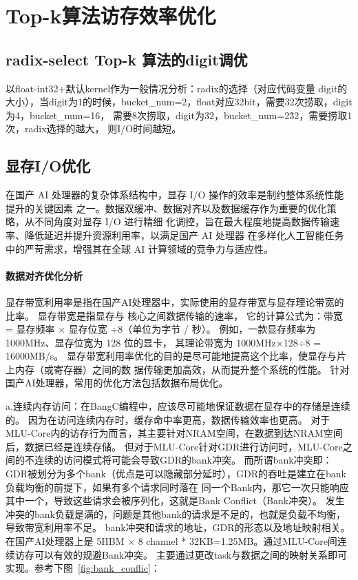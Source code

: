 \section{Top-k算法访存效率优化}
\subsection{radix-select Top-k 算法的digit调优}

以float-int32+默认kernel作为一般情况分析：radix的选择（对应代码变量
digit的大小），当digit为1的时候，bucket\_num=2，float对应32bit，需要32次捞取，digit为4，bucket\_num=16，
需要8次捞取，digit为32，bucket\_num=2\^32，需要捞取1次，radix选择的越大，
则I/O时间越短。


\subsection{显存I/O优化}
在国产 AI 处理器的复杂体系结构中，显存 I/O 操作的效率是制约整体系统性能提升的关键因素
之一。数据双缓冲、数据对齐以及数据缓存作为重要的优化策略，从不同角度对显存 I/O 进行精细
化调控，旨在最大程度地提高数据传输速率、降低延迟并提升资源利用率，以满足国产 AI 处理器
在多样化人工智能任务中的严苛需求，增强其在全球 AI 计算领域的竞争力与适应性。


\paragraph{数据对齐优化分析}

显存带宽利用率是指在国产AI处理器中，实际使用的显存带宽与显存理论带宽的比率。
显存带宽是指显存与 核心之间数据传输的速率，
它的计算公式为：带宽 = 显存频率 × 显存位宽 ÷8（单位为字节 / 秒）。
例如，一款显存频率为 1000MHz、显存位宽为 128 位的显卡，
其理论带宽为 1000MHz×128÷8 = 16000MB/s。
显存带宽利用率优化的目的是尽可能地提高这个比率，使显存与片上内存（或寄存器）之间的数
据传输更加高效，从而提升整个系统的性能。
针对国产AI处理器，常用的优化方法包括数据布局优化。

a.连续内存访问：在BangC编程中，应该尽可能地保证数据在显存中的存储是连续的。
因为在访问连续内存时，缓存命中率更高，数据传输效率也更高。
对于MLU-Core内的访存行为而言，其主要针对NRAM空间，在数据到达NRAM空间后，数据已经是连续存储。
但对于MLU-Core针对GDR进行访问时，MLU-Core之间的不连续的访问模式将可能会导致GDR的bank冲突。
而所谓bank冲突即：
GDR被划分为多个bank（优点是可以隐藏部分延时），GDR的吞吐是建立在bank负载均衡的前提下，如果有多个请求同时落在
同一个Bank内，那它一次只能响应其中一个，导致这些请求会被序列化，这就是Bank Conflict（Bank冲突）。
发生 冲突的bank负载是满的，问题是其他bank的请求是不足的，也就是负载不均衡，导致带宽利用率不足。
bank冲突和请求的地址，GDR的形态以及地址映射相关。
在国产AI处理器上是 5HBM × 8 channel * 32KB=1.25MB。通过MLU-Core间连续访存可以有效的规避Bank冲突。
主要通过更改task与数据之间的映射关系即可实现。参考下图~\ref{fig:bank_conflic}：

